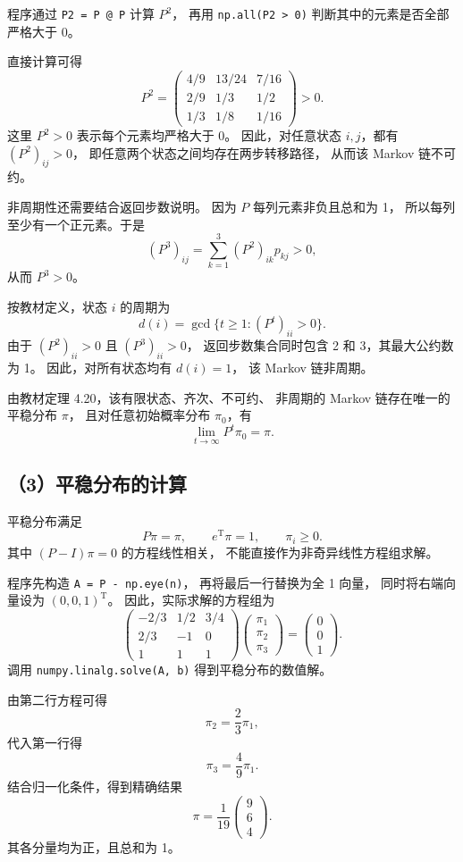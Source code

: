 \documentclass[UTF8,a4paper,11pt,fontset=fandol]{ctexart}
\begin{document}
程序通过 \texttt{P2 = P @ P} 计算 $P^2$，
再用 \texttt{np.all(P2 > 0)}
判断其中的元素是否全部严格大于 0。

直接计算可得
\[
P^2=
\begin{pmatrix}
4/9 & 13/24 & 7/16\\
2/9 & 1/3   & 1/2\\
1/3 & 1/8   & 1/16
\end{pmatrix}>0.
\]
这里 $P^2>0$ 表示每个元素均严格大于 0。
因此，对任意状态 $i,j$，都有 $(P^2)_{ij}>0$，
即任意两个状态之间均存在两步转移路径，
从而该 Markov 链不可约。

非周期性还需要结合返回步数说明。
因为 $P$ 每列元素非负且总和为 1，
所以每列至少有一个正元素。于是
\[
(P^3)_{ij}
=\sum_{k=1}^{3}(P^2)_{ik}p_{kj}>0,
\]
从而 $P^3>0$。

按教材定义，状态 $i$ 的周期为
\[
d(i)=\gcd\{t\geq1:(P^t)_{ii}>0\}.
\]
由于 $(P^2)_{ii}>0$ 且 $(P^3)_{ii}>0$，
返回步数集合同时包含 2 和 3，其最大公约数为 1。
因此，对所有状态均有 $d(i)=1$，
该 Markov 链非周期。

由教材定理 4.20，该有限状态、齐次、不可约、
非周期的 Markov 链存在唯一的平稳分布 $\pi$，
且对任意初始概率分布 $\pi_0$，有
\[
\lim_{t\to\infty}P^t\pi_0=\pi.
\]

\subsection*{（3）平稳分布的计算}

平稳分布满足
\[
P\pi=\pi,\qquad
e^{\mathrm T}\pi=1,\qquad \pi_i\geq0.
\]
其中 $(P-I)\pi=0$ 的方程线性相关，
不能直接作为非奇异线性方程组求解。

程序先构造 \texttt{A = P - np.eye(n)}，
再将最后一行替换为全 1 向量，
同时将右端向量设为 $(0,0,1)^{\mathrm T}$。
因此，实际求解的方程组为
\[
\begin{pmatrix}
-2/3 & 1/2 & 3/4\\
2/3  & -1  & 0\\
1    & 1   & 1
\end{pmatrix}
\begin{pmatrix}
\pi_1\\\pi_2\\\pi_3
\end{pmatrix}
=
\begin{pmatrix}
0\\0\\1
\end{pmatrix}.
\]
调用 \texttt{numpy.linalg.solve(A, b)}
得到平稳分布的数值解。

由第二行方程可得
\[
\pi_2=\frac23\pi_1,
\]
代入第一行得
\[
\pi_3=\frac49\pi_1.
\]
结合归一化条件，得到精确结果
\[
\pi=\frac1{19}
\begin{pmatrix}
9\\6\\4
\end{pmatrix}.
\]
其各分量均为正，且总和为 1。
\end{document}
